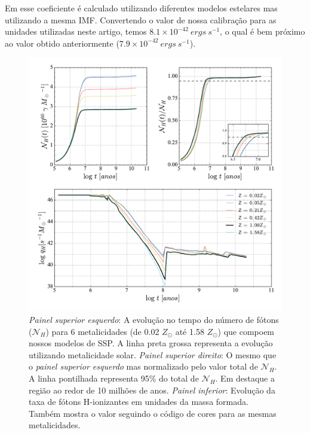 Em \citet{Kennicutt.1998a} esse coeficiente é calculado utilizando diferentes modelos estelares mas
utilizando a mesma IMF. Convertendo o valor de nossa calibração para as unidades utilizadas neste
artigo, temos $8.1 \times 10^{-42}\ ergs\ s^{-1}$, o qual é bem próximo ao valor obtido
anteriormente ($7.9 \times 10^{-42}\ ergs\ s^{-1}$).

\begin{figure}
	\centering
	\includegraphics[scale=0.62]{figuras/Nh_logt_metBase_Padova2000_salp.pdf}
	\caption[Evolução temporal do número e da taxa de fótons H-ionizantes em unidades da massa
	formada.] 
	{\emph{Painel superior esquerdo}: A	evolução no tempo do número de fótons ($\mathcal{N}_H$) para 6
metalicidades (de 0.02 $Z_\odot$ até 1.58 $Z_\odot$) que compoem nossos modelos de SSP. A linha
preta grossa representa a evolução utilizando metalicidade solar. \emph{Painel superior direito}:
O mesmo que o \emph{painel superior esquerdo} mas normalizado pelo valor total de $\mathcal{N}_H$.
A linha pontilhada representa 95\% do total de $\mathcal{N}_H$. Em destaque a região ao redor de 10
milhões de anos. \emph{Painel inferior}: Evolução da taxa de fótons H-ionizantes em unidades da
massa formada.
Também mostra o valor seguindo o código de cores para as mesmas metalicidades.}
	\label{fig:Nh_qh}
\end{figure}
 
